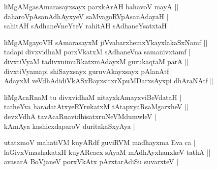 \begin{entry}
\medskip
\begin{shl}
liMgAMgasAmarasayxsayx parxkArAH bahavoV mayA ||\\[2pt]
daharoVpAsanAdhAyxyeV saMvagoRVpAsanAdayaH |\\[2pt]
sahitAH sAdhaneVneYteV rahitAH sAdhaneYsatxtaH ||\\[-1pt]
\end{shl}
\medskip
{}
\medskip
\begin{shl}
liMgAMgayoVH sAmarasayxM jiVvabarxhemxYkayxlakaSxNamf ||\\[2pt]
tadapi divxvidhaM porxVkatxM sAdhaneVna samanivxtamf |\\[2pt]
divxtiVyaM tadivxnimuRkatxmAdayxM gurukaqtaM parA ||\\[2pt]
divxtiVyamapi shiSayxsayx guruvAkayxsayx pAlanAtf |\\[2pt]
AdayxM veVdhAdidiVkASxBayxsitxrXpuMDarxsAyxpi dhAraNAtf ||\\[-1pt]
\end{shl}
\medskip
{}
\smallskip
{}
\medskip
\begin{shl}
liMgAcaRnaM tu divxvidhaM nitayxkAmayxviBeVdataH |\\[2pt]
tatheYva haradatAtxyeRYrukatxM tAtapxyaRsaMgarxheV ||\\[2pt]
devxVdhA tavAcaRnavidhisatxruNeVMdumwleV |\\[2pt]
kAmAya kashicxdaparoV duritakaSxyAya |\\[-1pt]
\end{shl}
\medskip
{}
\smallskip
{}
\medskip
\begin{shl}
utatxmoV mahatiVM kuyARdf guviRVM madhayxma Eva ca |\\[2pt]
laGivxVmashakatxH kuyARcacx sAyaM mAdhAyxhanxkeV tathA ||\\[2pt]
avasarA BoVjaneV porxVkAtx pArxtarAdiSu suvarxteV |
\end{shl}

\eject


\end{entry}
